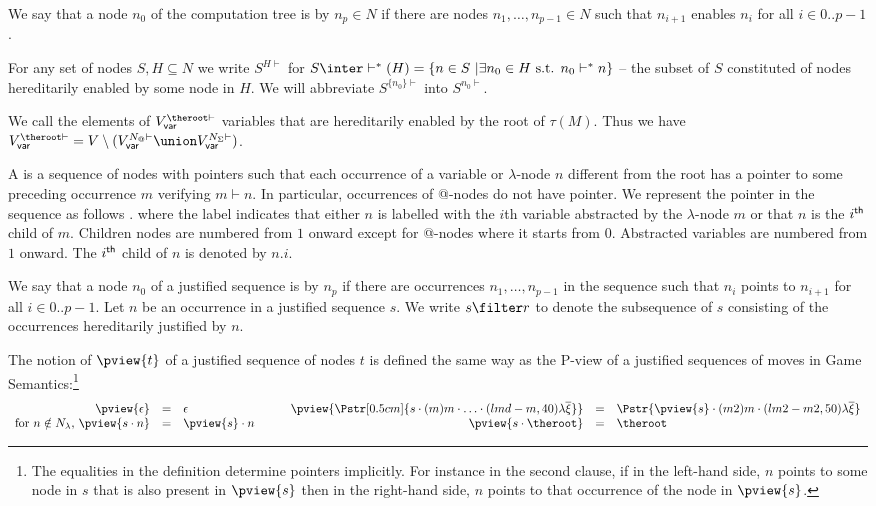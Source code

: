 We say that a node $n_0$ of the computation tree is
 by $n_p \in N$ if there are nodes
$n_1,\ldots, n_{p-1} \in N$ such that $n_{i+1}$ enables $n_{i}$ for
all $i\in 0..p-1$.

For any set of nodes $S, H \subseteq N$ we write $S^{H\vdash}$ for
$S \inter \vdash^*(H) = \{ n \in S \ | \exists n_0 \in H \mbox{ s.t.
}n_0  \vdash^* n \}$ -- the subset of $S$ constituted of nodes
hereditarily enabled by some node in $H$. We will abbreviate
$S^{\{n_0\}\vdash}$ into $S^{n_0\vdash}$.

We call  the elements of $V_{\sf
var}^{\theroot\vdash}$ \ie variables that are hereditarily enabled
by the root of $\tau(M)$. Thus we have $V_{\sf var}^{\theroot\vdash}
= V \setminus ( V_{\sf var}^{N_@\vdash} \union V_{\sf
var}^{N_\Sigma\vdash})$.

A  is a sequence of nodes with
pointers such that each occurrence of a variable or $\lambda$-node
$n$ different from the root has a pointer to some preceding
occurrence $m$ verifying $m \vdash n$. In particular, occurrences of
@-nodes do not have pointer. We represent the pointer in the
sequence as follows .
 where the label indicates that either $n$ is labelled with the $i$th variable
abstracted by the $\lambda$-node $m$ or that $n$ is the $i^{\sf th}$
child of $m$.  Children nodes are numbered from $1$ onward except for
@-nodes where it starts from $0$. Abstracted variables are numbered
from $1$ onward. The $i^{\sf th}$ child of $n$ is denoted by $n.i$.

We say that a node $n_0$ of a justified sequence is
 by $n_p$ if there are occurrences $n_1,
\ldots, n_{p-1}$ in the sequence such that $n_i$ points to $n_{i+1}$
for all $i\in 0..p-1$. Let $n$ be an occurrence in a justified
sequence $s$. We write $s \filter r$ to denote the subsequence of
$s$ consisting of the occurrences hereditarily justified by $n$.


The notion of  $\pview{t}$ of a justified sequence of
nodes $t$ is defined the same way as the P-view of a justified
sequences of moves in Game Semantics:\footnote{ The equalities in the
  definition determine pointers implicitly. For instance in the second
  clause, if in the left-hand side, $n$ points to some node in $s$
  that is also present in $\pview{s}$ then in the right-hand side, $n$
  points to that occurrence of the node in $\pview{s}$.}
$$\begin{array}{rclrcl}
\pview{\epsilon} &=&  \epsilon
& \pview{\Pstr[0.5cm]{ s \cdot (m) m \cdot \ldots \cdot (lmd-m,40){\lambda\overline{\xi}}
}}
 &=& \Pstr{
\pview{s} \cdot (m2) m \cdot (lm2-m2,50) {\lambda \overline{\xi}} } \\
\mbox{for $n \notin N_\lambda$, } \pview{s \cdot n }  &=&  \pview{s} \cdot n \qquad
& \pview{s \cdot \theroot }  &=&  \theroot
\end{array}$$

